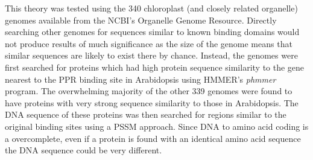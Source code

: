 This theory was tested using the 340 chloroplast (and closely related
organelle)
genomes available from the NCBI's Organelle Genome Resource.
Directly searching other genomes for sequences similar to known binding domains
would not produce results of much significance as the size of the genome means
that similar sequences are likely to exist there by chance.
Instead, the genomes were first searched for proteins which had high protein
sequence similarity to the gene nearest to the PPR binding site in Arabidopsis
using HMMER's \emph{phmmer} program.
The overwhelming majority of the other 339 genomes were found to have proteins 
with very strong sequence similarity to those in Arabidopsis. 
The DNA sequence of these proteins was then searched for regions similar to the
original binding sites using a PSSM approach.
Since DNA to amino acid coding is a overcomplete, even if a protein is found
with an identical amino acid sequence the DNA sequence could be very different.


